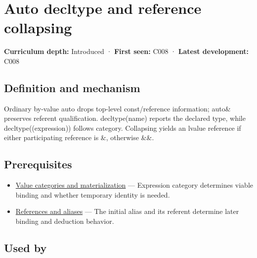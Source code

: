 \hypertarget{appendix-5d4252a42886}{}\label{referencestart:appendix-5d4252a42886}
\section{Auto decltype and reference collapsing}\label{appendix-5d4252a42886-auto-decltype-and-reference-collapsing}

\hypertarget{appendix-5d4252a42886-auto-decltype-and-reference-collapsing}{}

\textbf{Curriculum depth:} Introduced · \textbf{First seen:} C008 · \textbf{Latest development:} C008

\begin{allmightroledefinition}

\subsection{Definition and mechanism}\label{appendix-5d4252a42886-definition-and-mechanism}

\hypertarget{appendix-5d4252a42886-definition-and-mechanism}{}

Ordinary by-value auto drops top-level const/reference information; auto\& preserves referent qualification. decltype(name) reports the declared type, while decltype((expression)) follows category. Collapsing yields an lvalue reference if either participating reference is \&, otherwise \&\&.

\end{allmightroledefinition}

\subsection{Prerequisites}\label{appendix-5d4252a42886-prerequisites}

\hypertarget{appendix-5d4252a42886-prerequisites}{}

\begin{itemize}
\tightlist
\item
  \hyperref[appendix-1121b30eaeb0]{Value categories and materialization} --- Expression category determines viable binding and whether temporary identity is needed.
\item
  \hyperref[appendix-d6d562ca9fbb]{References and aliases} --- The initial alias and its referent determine later binding and deduction behavior.
\end{itemize}

\subsection{Used by}\label{appendix-5d4252a42886-used-by}

